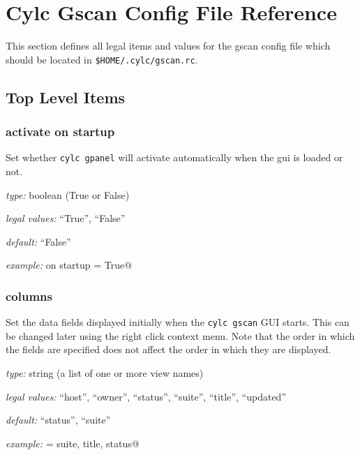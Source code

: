 
\section{Cylc Gscan Config File Reference}
\label{GscanRCReference}

\lstset{language=bash}

This section defines all legal items and values for the gscan config
file which should be located in
\lstinline=$HOME/.cylc/gscan.rc=.

\subsection{Top Level Items}


\subsubsection{activate on startup}
Set whether
\lstinline=cylc gpanel=
will activate automatically when the gui is loaded or not.

\begin{myitemize}
    \item {\em type:} boolean (True or False)
\item {\em legal values:} ``True'', ``False''
\item {\em default:} ``False''
\item {\em example:} \lstinline@activate on startup = True@
\end{myitemize}


\subsubsection{columns}
Set the data fields displayed initially when the
\lstinline=cylc gscan=
GUI starts. This
can be changed later using the right click context menu.
\newline
Note that the order in
which the fields are specified does not affect the order in which they are
displayed.

\begin{myitemize}
\item {\em type:} string (a list of one or more view names)
\item {\em legal values:} ``host'', ``owner'', ``status'', ``suite'',  ``title'',
        ``updated''
\item {\em default:} ``status'', ``suite''
\item {\em example:} \lstinline@columns = suite, title, status@
\end{myitemize}
